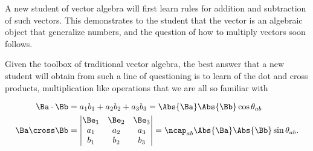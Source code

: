 A new student of vector algebra will first learn
%
%
%
%
rules for addition and subtraction of such vectors.
This demonstrates to the student that the vector is an algebraic object that generalize numbers, and the question of how to
multiply vectors soon follows.

Given the toolbox of traditional vector algebra, the best answer that a new student will obtain from such a line of questioning is to learn of the dot and cross products, multiplication like operations that we are all so familiar with


\begin{dmath}\label{eqn:GAmotivation:60}
\begin{aligned}
\Ba \cdot \Bb &= a_1 b_1 + a_2 b_2 + a_3 b_3 = \Abs{\Ba} \Abs{\Bb} \cos \theta_{ab} \\
\Ba \cross \Bb &=
\begin{vmatrix}
\Be_1 & \Be_2 & \Be_3 \\
a_1 & a_2 & a_3 \\
b_1 & b_2 & b_3 \\
\end{vmatrix}
= \ncap_{ab} \Abs{\Ba} \Abs{\Bb} \sin\theta_{ab}.
\end{aligned}
\end{dmath}

